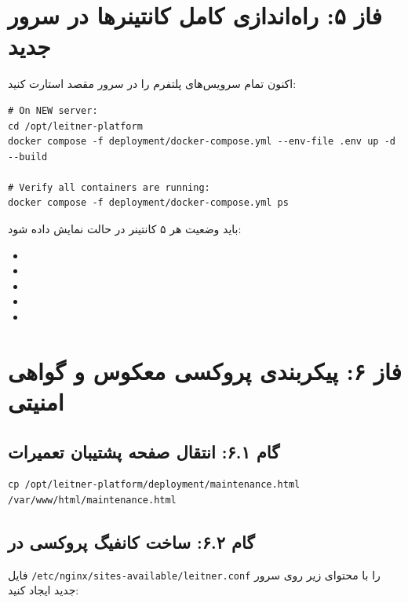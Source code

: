 \documentclass[11pt,a4paper]{article}
\begin{document}
\section{فاز ۵: راه‌اندازی کامل کانتینرها در سرور جدید}
اکنون تمام سرویس‌های پلتفرم را در سرور مقصد استارت کنید:
\begin{latin}
\small
\begin{verbatim}
# On NEW server:
cd /opt/leitner-platform
docker compose -f deployment/docker-compose.yml --env-file .env up -d --build

# Verify all containers are running:
docker compose -f deployment/docker-compose.yml ps
\end{verbatim}
\end{latin}
باید وضعیت هر ۵ کانتینر در حالت  نمایش داده شود:
\begin{itemize}
    \item {}
    \item {}
    \item {}
    \item {}
    \item {}
\end{itemize}

\section{فاز ۶: پیکربندی پروکسی معکوس  و گواهی امنیتی }

\subsection{گام ۶.۱: انتقال صفحه پشتیبان تعمیرات}
\begin{latin}
\small
\begin{verbatim}
cp /opt/leitner-platform/deployment/maintenance.html /var/www/html/maintenance.html
\end{verbatim}
\end{latin}

\subsection{گام ۶.۲: ساخت کانفیگ پروکسی در }
فایل \verb|/etc/nginx/sites-available/leitner.conf| را با محتوای زیر روی سرور جدید ایجاد کنید:
\end{document}
